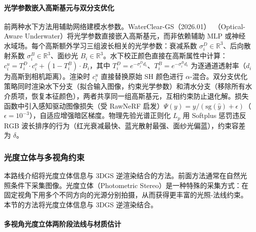 \paragraph{光学参数嵌入高斯基元与双分支优化}

前两种水下方法用辅助网络建模水参数。WaterClear-GS（2026.01）~\cite{2601_19753}（Optical-Aware Underwater）将光学参数直接嵌入高斯基元，而非依赖辅助 MLP 或神经水域场。每个高斯额外学习三组波长相关的光学参数：衰减系数 $\sigma_i^D \in \mathbb{R}^3$、后向散射系数 $\sigma_i^B \in \mathbb{R}^3$、面纱光 $B_i \in \mathbb{R}^3$。水下校正颜色直接在高斯属性中计算：$c_i^u = T_i^D \cdot c_i^o + (1-T_i^B) \cdot B_i$，其中 $T_i^D = e^{-\sigma_i^D d_i}$、$T_i^B = e^{-\sigma_i^B d_i}$ 为逐通道透射率（$d_i$ 为高斯到相机距离）。渲染时 $c_i^u$ 直接替换原始 SH 颜色进行 $\alpha$-混合。双分支优化策略同时渲染水下分支（拟合输入图像，约束光学参数）和清水分支（移除所有水介质项，恢复本征颜色），两者共享同一组高斯基元，互相约束防止退化解。损失函数中引入感知驱动图像损失（受 RawNeRF 启发）$\Psi(y) = y / (\text{sg}(\hat{y}) + \epsilon)$（$\epsilon=10^{-3}$），自适应增强暗区梯度。物理先验光谱正则化 $L_p$ 用 Softplus 惩罚违反 RGB 波长排序的行为（红光衰减最快、蓝光散射最强、面纱光偏蓝），约束容差为 $\delta$。

\subsubsection{光度立体与多视角约束}

本路线介绍将光度立体信息与 3DGS 逆渲染结合的方法。前面方法通常在自然光照条件下采集图像。光度立体（Photometric Stereo）是一种特殊的采集方式：在固定视角下用多个不同方向的光源分别拍摄，从而获得更丰富的光照-法线约束。本节的方法将光度立体信息与 3DGS 逆渲染结合。

\paragraph{多视角光度立体两阶段法线与材质估计}

